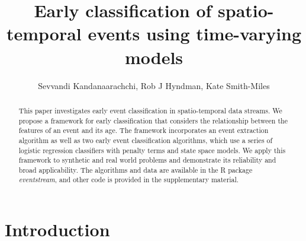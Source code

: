 \documentclass[a4paper,11pt]{article}
\begin{document}

\title{Early classification of spatio-temporal events using time-varying models}
\author{Sevvandi Kandanaarachchi, Rob J Hyndman, Kate Smith-Miles}
\maketitle

\begin{abstract}
This paper investigates early event classification in spatio-temporal data streams. We propose a framework for early classification that considers the relationship between the features of an event and its age. The framework incorporates an event extraction algorithm as well as two early event classification algorithms, which use a series of logistic regression classifiers with penalty terms and state space models. We apply this framework to synthetic and real world problems and demonstrate its reliability and broad applicability. The algorithms and data are available in the R package \textit{eventstream}, and other code is provided in the supplementary material.
\end{abstract}



\section{Introduction}
\end{document}
